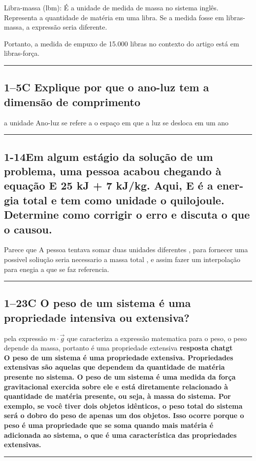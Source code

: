 \documentclass{article}
\begin{document}
Libra-massa (lbm): É a unidade de medida de massa no sistema inglês. Representa a quantidade de matéria em uma libra. Se a medida fosse em libras-massa, a expressão seria diferente.

Portanto, a medida de empuxo de 15.000 libras no contexto do artigo está em libras-força.\\
\noindent\rule{\textwidth}{0.4pt}
\subsection*{1–5C Explique por que o ano-luz tem a dimensão de comprimento} a unidade Ano-luz se refere a o espaço em que a luz se desloca em um ano

\noindent\rule{\textwidth}{0.4pt}
\subsection*{1-14Em algum estágio da solução de um problema, uma pessoa acabou chegando à equação E  25 kJ + 7 kJ/kg. Aqui, E é a ener- gia total e tem como unidade o quilojoule. Determine como corrigir o erro e discuta o que o causou.}
Parece que A pessoa tentava somar duas unidades diferentes , para fornecer uma possivel soliução seria necessario a massa total , e assim fazer um interpolação para enegia a que se faz referencia.\\
\noindent\rule{\textwidth}{0.4pt}


\subsection*{1–23C O peso de um sistema é uma propriedade intensiva ou extensiva?}pela expressão $m \cdot\vec{g} $ que caracteriza a expressão matematica para o peso, o peso depende da massa, portanto é uma propriedade extensiva
\textbf{resposta chatgt\\O peso de um sistema é uma propriedade extensiva. Propriedades extensivas são aquelas que dependem da quantidade de matéria presente no sistema. O peso de um sistema é uma medida da força gravitacional exercida sobre ele e está diretamente relacionado à quantidade de matéria presente, ou seja, à massa do sistema.
Por exemplo, se você tiver dois objetos idênticos, o peso total do sistema será o dobro do peso de apenas um dos objetos. Isso ocorre porque o peso é uma propriedade que se soma quando mais matéria é adicionada ao sistema, o que é uma característica das propriedades extensivas.}\\
\noindent\rule{\textwidth}{0.4pt}
\end{document}
